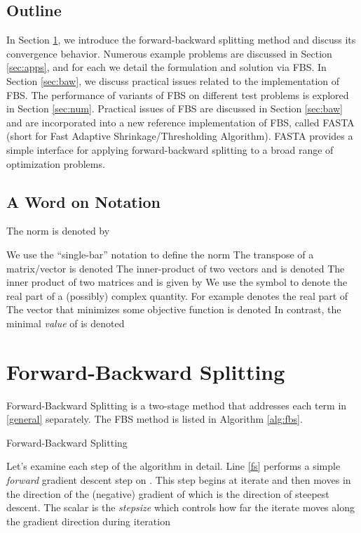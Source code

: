 \documentclass{amsart}
\theoremstyle{definition}
\begin{document}
 \subsection{Outline}
 
  In Section \ref{sec:fbs}, we introduce the forward-backward splitting method and discuss its convergence behavior.  Numerous example problems are discussed in Section \ref{sec:apps}, and for each we detail the formulation and solution via FBS.  In Section \ref{sec:baw}, we discuss practical issues related to the implementation of FBS.  The performance of variants of FBS on different test problems is explored in Section \ref{sec:num}.
Practical issues of FBS are discussed in Section \ref{sec:baw} and are incorporated into a new reference implementation of FBS, called FASTA (short for Fast Adaptive Shrinkage/Thresholding Algorithm).  FASTA provides a simple interface for applying forward-backward splitting to a broad range of optimization problems.

  
  
     
 \subsection{A Word on Notation}
 The   norm is denoted by
 
We use the ``single-bar'' notation to define the  norm 
 The transpose of a matrix/vector  is denoted   The inner-product of two vectors  and  is denoted   The inner product of two matrices  and  is given by  We use the symbol  to denote the real part of a (possibly) complex quantity. For example  denotes the real part of   
The vector  that minimizes some objective function  is denoted    In contrast, the minimal {\em value} of  is denoted 
   
  
\section{Forward-Backward Splitting} \label{sec:fbs}
Forward-Backward Splitting is a two-stage method that addresses each term in \eqref{general} separately.  The FBS method is listed in Algorithm \ref{alg:fbs}.

\begin{algorithm}[H]
\begin{algorithmic}
 
\EndWhile
\end{algorithmic}
\caption{Forward-Backward Splitting}
\label{alg:fbs}
\end{algorithm}
Let's examine each step of the algorithm in detail.  Line \eqref{fs} performs a simple {\em forward} gradient descent step on .  This step begins at iterate  and then moves in the direction of the (negative) gradient of  which is the direction of steepest descent.  The scalar  is the {\em stepsize} which controls how far the iterate moves along the gradient direction during iteration 
\end{document}
